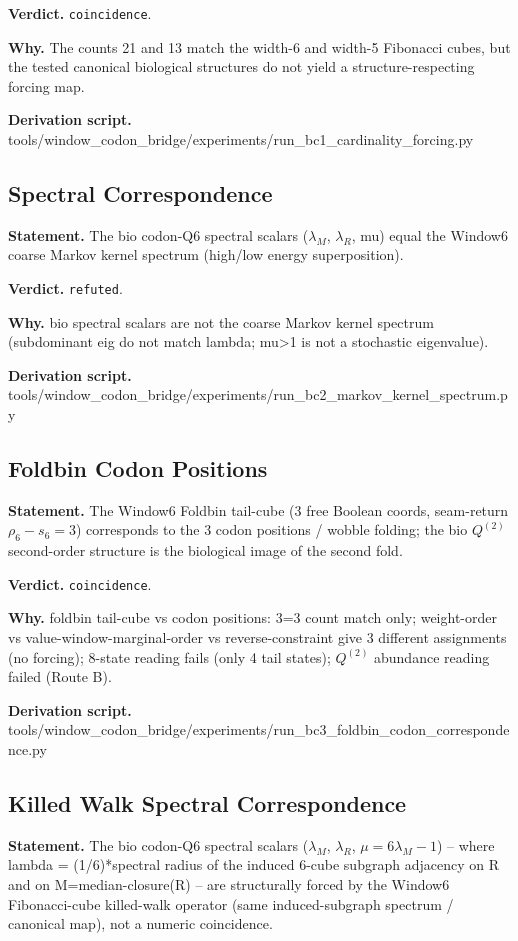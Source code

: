 \textbf{Verdict.} \texttt{coincidence}.

\textbf{Why.} The counts 21 and 13 match the width-6 and width-5 Fibonacci cubes, but the tested canonical
biological structures do not yield a structure-respecting forcing map.

\textbf{Derivation script.} tools/window\_codon\_bridge/experiments/run\_bc1\_cardinality\_forcing.py

\subsection{Spectral Correspondence}\label{sec:bridge-spectral-correspondence}
\textbf{Statement.} The bio codon-Q6 spectral scalars ($\lambda_M$, $\lambda_R$, mu) equal the Window6 coarse Markov
kernel spectrum (high/low energy superposition).

\textbf{Verdict.} \texttt{refuted}.

\textbf{Why.} bio spectral scalars are not the coarse Markov kernel spectrum (subdominant eig do not match lambda;
mu>1 is not a stochastic eigenvalue).

\textbf{Derivation script.} tools/window\_codon\_bridge/experiments/run\_bc2\_markov\_kernel\_spectrum.py

\subsection{Foldbin Codon Positions}\label{sec:bridge-foldbin-codon-positions}
\textbf{Statement.} The Window6 Foldbin tail-cube (3 free Boolean coords, seam-return $\rho_6-s_6=3$) corresponds to the
3 codon positions / wobble folding; the bio $Q^{(2)}$ second-order structure is the biological image
of the second fold.

\textbf{Verdict.} \texttt{coincidence}.

\textbf{Why.} foldbin tail-cube vs codon positions: 3=3 count match only; weight-order vs
value-window-marginal-order vs reverse-constraint give 3 different assignments (no forcing); 8-state
reading fails (only 4 tail states); $Q^{(2)}$ abundance reading failed (Route B).

\textbf{Derivation script.} tools/window\_codon\_bridge/experiments/run\_bc3\_foldbin\_codon\_correspondence.py

\subsection{Killed Walk Spectral Correspondence}\label{sec:bridge-killed-walk-spectral-correspondence}
\textbf{Statement.} The bio codon-Q6 spectral scalars ($\lambda_M$, $\lambda_R$, $\mu=6\lambda_M-1$) -- where lambda =
(1/6)*spectral radius of the induced 6-cube subgraph adjacency on R and on M=median-closure(R) --
are structurally forced by the Window6 Fibonacci-cube killed-walk operator (same induced-subgraph
spectrum / canonical map), not a numeric coincidence.

